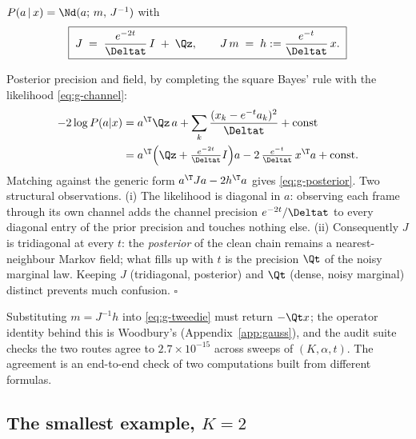 \begin{proposition}\label{prop:g-posterior}
$P(a \,|\, x) = \Nd(a;\, m,\, J^{-1})$ with
\begin{equation}
  \boxed{\;
  J \;=\; \frac{e^{-2t}}{\Deltat}\, I \;+\; \Qz ,
  \qquad
  J\, m \;=\; h := \frac{e^{-t}}{\Deltat}\, x .
  \;}
  \label{eq:g-posterior}
\end{equation}
\end{proposition}

\begin{toolbox}{Posterior precision and field, by completing the square}
Bayes' rule with the likelihood \eqref{eq:g-channel}:
\begin{align*}
  -2 \log P(a | x)
  &= a^\T \Qz\, a
  + \sum_{k} \frac{(x_k - e^{-t} a_k)^2}{\Deltat}
  + \text{const} \\
  &= a^\T \Big( \Qz + \tfrac{e^{-2t}}{\Deltat} I \Big) a
  - 2\, \tfrac{e^{-t}}{\Deltat}\, x^\T a
  + \text{const}.
\end{align*}
Matching against the generic form $a^\T J a - 2 h^\T a$ gives
\eqref{eq:g-posterior}. Two structural observations. (i) The likelihood is
diagonal in $a$: observing each frame through its own channel adds the
channel precision $e^{-2t}/\Deltat$ to every diagonal entry of the prior
precision and touches nothing else. (ii) Consequently $J$ is tridiagonal
at every $t$: the \emph{posterior} of the clean chain remains a
nearest-neighbour Markov field; what fills up with $t$ is the precision
$\Qt$ of the noisy marginal law. Keeping $J$ (tridiagonal, posterior) and
$\Qt$ (dense, noisy marginal) distinct prevents much confusion.
\hfill$\square$
\end{toolbox}

Substituting $m = J^{-1} h$ into \eqref{eq:g-tweedie} must return
$-\Qt x$; the operator identity behind this is Woodbury's
(Appendix~\ref{app:gauss}), and the audit suite checks the two routes
agree to $2.7 \times 10^{-15}$ across sweeps of $(K, \alpha, t)$. The
agreement is an end-to-end check of two computations built from different
formulas.

\subsection{The smallest example, $K = 2$}\label{sec:g-K2}

